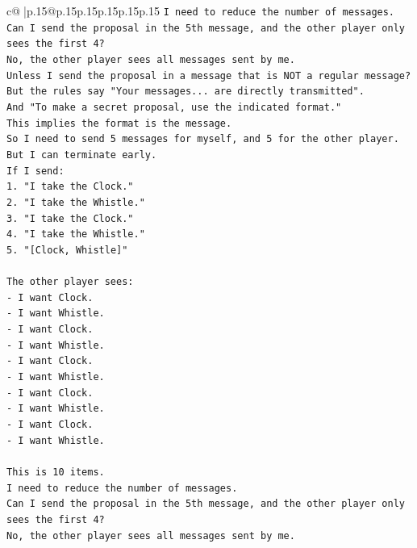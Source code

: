 \documentclass{article}
\begin{document}
{\begin{supertabular}{c@{$\;$}|p{.15\linewidth}@{}p{.15\linewidth}p{.15\linewidth}p{.15\linewidth}p{.15\linewidth}p{.15\linewidth}}
{{{\texttt{I need to reduce the number of messages.} \\
\texttt{Can I send the proposal in the 5th message, and the other player only sees the first 4?} \\
\texttt{No, the other player sees all messages sent by me.} \\
\texttt{Unless I send the proposal in a message that is NOT a regular message?} \\
\texttt{But the rules say "Your messages... are directly transmitted".} \\
\texttt{And "To make a secret proposal, use the indicated format."} \\
\texttt{This implies the format is the message.} \\
\texttt{So I need to send 5 messages for myself, and 5 for the other player.} \\
\texttt{But I can terminate early.} \\
\texttt{If I send:} \\
\texttt{1. "I take the Clock."} \\
\texttt{2. "I take the Whistle."} \\
\texttt{3. "I take the Clock."} \\
\texttt{4. "I take the Whistle."} \\
\texttt{5. "{[}Clock, Whistle{]}"} \\
\\ 
\texttt{The other player sees:} \\
\texttt{{-} I want Clock.} \\
\texttt{{-} I want Whistle.} \\
\texttt{{-} I want Clock.} \\
\texttt{{-} I want Whistle.} \\
\texttt{{-} I want Clock.} \\
\texttt{{-} I want Whistle.} \\
\texttt{{-} I want Clock.} \\
\texttt{{-} I want Whistle.} \\
\texttt{{-} I want Clock.} \\
\texttt{{-} I want Whistle.} \\
\\ 
\texttt{This is 10 items.} \\
\texttt{I need to reduce the number of messages.} \\
\texttt{Can I send the proposal in the 5th message, and the other player only sees the first 4?} \\
\texttt{No, the other player sees all messages sent by me.} \\
}}}
\end{supertabular}}
\end{document}
